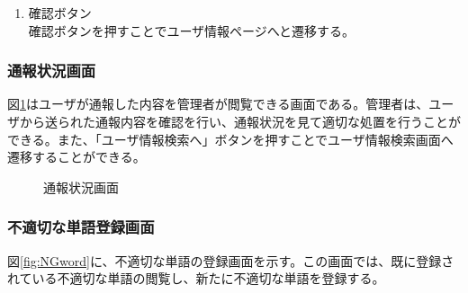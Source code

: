 \documentclass[a4j]{jarticle}
\begin{document}
\begin{enumerate}
  \renewcommand{\labelenumi}{\textcircled{\scriptsize \theenumi}}

\item 確認ボタン\\
確認ボタンを押すことでユーザ情報ページへと遷移する。

\end{enumerate}


\subsubsection{通報状況画面}
図\ref{fig:report_admin}はユーザが通報した内容を管理者が閲覧できる画面である。管理者は、ユーザから送られた通報内容を確認を行い、通報状況を見て適切な処置を行うことができる。また、「ユーザ情報検索へ」ボタンを押すことでユーザ情報検索画面へ遷移することができる。
\begin{figure}[H]
\begin{center}
\caption{通報状況画面}
\label{fig:report_admin}
\end{center}
\end{figure}

\subsubsection{不適切な単語登録画面}
図\ref{fig:NGword}に、不適切な単語の登録画面を示す。この画面では、既に登録されている不適切な単語の閲覧し、新たに不適切な単語を登録する。
\end{document}
